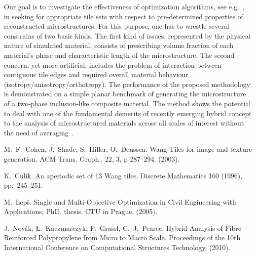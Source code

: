 Our goal is to investigate the effectiveness of optimization algorithms, see e.g.~\cite{Leps05}, in seeking for appropriate tile sets with respect to pre-determined properties of reconstructed microstructures. For this purpose, one has to wrestle several constrains of two basic kinds. The first kind of issues, represented by the physical nature of simulated material, consists of prescribing volume fraction of each material's phase and characteristic length of the microstructure. The second concern, yet more artificial, includes the problem of interaction between contiguous tile edges and required overall material behaviour (isotropy/anisotropy/orthotropy). The performance of the proposed methodology is demonstrated on a simple planar benchmark of generating the microstructure of a two-phase inclusion-like composite material. The method shows the potential to deal with one of the fundamental demerits of recently emerging hybrid concept to the analysis of microstructured materials across all scales of interest without the need of averaging~\cite{Novak10}. 


\begin{thebibliography}{10}
{\sc M.~F.~Cohen, J.~Shade, S.~Hiller, O.~Deussen}. {Wang Tiles for image and texture generation}. ACM Trans. Graph., 22, 3, p 287--294, (2003).

{\sc K.~Culik}. {An aperiodic set of 13 Wang tiles}. Discrete Mathematics 160 (1996), pp.~245--251.

{\sc M.~Lep\v{s}}. {Single and Multi-Objective Optimization in Civil Engineering with Applications}, PhD. thesis, CTU in Prague, (2005).

{\sc J.~Nov\'{a}k, \L.~Kaczmarczyk, P.~Grassl, C.~J.~Pearce}. {Hybrid Analysis of Fibre Reinforced Polypropylene from Micro to Macro Scale}. Proceedings of the 10th International Conference on Computational Structures Technology, (2010).
\end{thebibliography}
